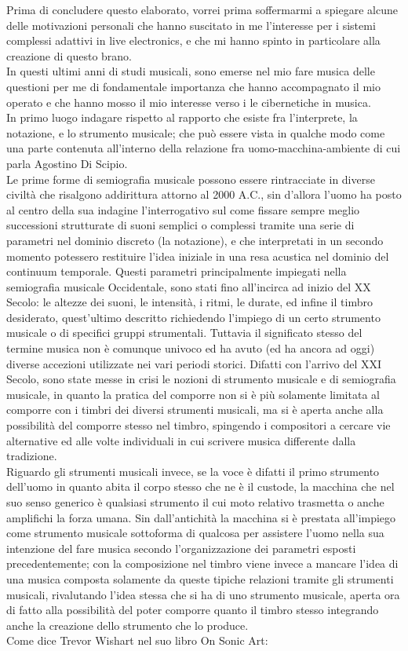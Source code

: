 Prima di concludere questo elaborato, 
vorrei prima soffermarmi a spiegare alcune delle motivazioni 
personali che hanno suscitato in me l'interesse per i 
sistemi complessi adattivi in live electronics, 
e che mi hanno spinto in particolare alla creazione di questo brano. \\
In questi ultimi anni di studi musicali, sono emerse nel mio fare musica 
delle questioni per me di fondamentale importanza che hanno accompagnato il mio operato
e che hanno mosso il mio interesse verso i le cibernetiche in musica. \\
In primo luogo indagare rispetto al rapporto che esiste fra l'interprete, la notazione, e lo strumento musicale;
che può essere vista in qualche modo come una parte contenuta all'interno 
della relazione fra uomo-macchina-ambiente di cui parla
Agostino Di Scipio. \\
Le prime forme di semiografia musicale possono essere rintracciate in diverse civiltà 
che risalgono addirittura attorno al 2000 A.C.,
sin d'allora l'uomo ha posto al centro della sua indagine l'interrogativo sul come fissare sempre meglio 
successioni strutturate di suoni semplici o complessi tramite una serie di parametri nel dominio discreto (la notazione), 
e che interpretati in un secondo momento potessero restituire l'idea iniziale in una resa 
acustica nel dominio del continuum temporale.
Questi parametri principalmente impiegati nella semiografia musicale Occidentale, 
sono stati fino all'incirca ad inizio del XX Secolo: 
le altezze dei suoni, le intensità, i ritmi, le durate, ed infine il timbro desiderato, 
quest'ultimo descritto richiedendo l'impiego di un certo strumento musicale o di specifici gruppi strumentali.
Tuttavia il significato stesso del termine musica non è comunque univoco ed ha avuto (ed ha ancora ad oggi) 
diverse accezioni utilizzate nei vari periodi storici.
Difatti con l'arrivo del XXI Secolo, sono state messe in crisi le nozioni di strumento musicale e di semiografia musicale, 
in quanto la pratica del comporre non si è più solamente limitata al comporre 
con i timbri dei diversi strumenti musicali, ma si è aperta anche alla possibilità del comporre stesso nel timbro, 
spingendo i compositori a cercare vie alternative ed alle volte individuali in cui scrivere musica differente dalla tradizione.\\
Riguardo gli strumenti musicali invece, se la voce è difatti il primo strumento dell'uomo in quanto 
abita il corpo stesso che ne è il custode, la macchina che nel suo senso generico è qualsiasi strumento 
il cui moto relativo trasmetta o anche amplifichi la forza umana.
Sin dall'antichità la macchina si è prestata all'impiego come strumento musicale sottoforma di qualcosa per assistere l'uomo nella 
sua intenzione del fare musica secondo l'organizzazione dei parametri esposti precedentemente; 
con la composizione nel timbro viene invece a mancare l'idea 
di una musica composta solamente da queste tipiche relazioni tramite gli strumenti musicali, 
rivalutando l'idea stessa che si ha di uno strumento musicale, aperta ora di fatto alla possibilità 
del poter comporre quanto il timbro stesso integrando anche la creazione dello strumento che lo produce. \\
Come dice Trevor Wishart nel suo libro On Sonic Art:

